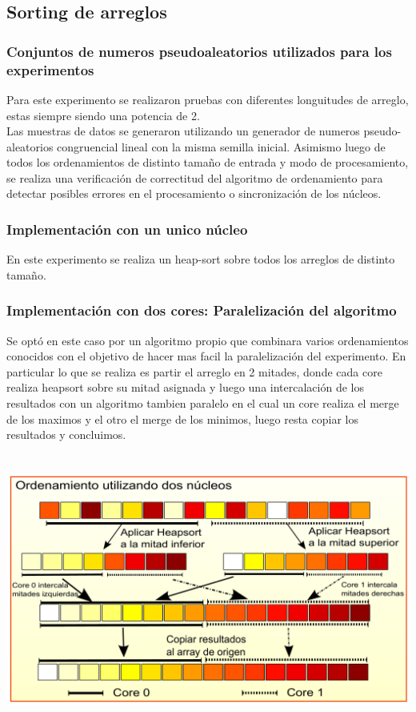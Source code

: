 \subsection{Sorting de arreglos}	
    \subsubsection{Conjuntos de numeros pseudoaleatorios utilizados para los experimentos}
    	Para este experimento se realizaron pruebas con diferentes longuitudes de arreglo, estas siempre
    	siendo una potencia de 2.\\
    	Las muestras de datos se generaron utilizando un generador de numeros pseudo-aleatorios
    	congruencial lineal con la misma semilla inicial.
        Asimismo luego de todos los ordenamientos de distinto tamaño de entrada y modo de procesamiento, se realiza una verificación de correctitud del algoritmo de ordenamiento para detectar posibles errores en el procesamiento o sincronización de los núcleos.
    \subsubsection{Implementación con un unico núcleo}
    	En este experimento se realiza un heap-sort sobre todos los arreglos de distinto tamaño.
    \subsubsection{Implementación con dos cores: Paralelización del algoritmo}
    	Se optó en este caso por un algoritmo propio que combinara varios ordenamientos conocidos con el objetivo de hacer mas facil la paralelización del experimento. En particular lo que se realiza es partir el arreglo en 2 mitades, donde cada core realiza heapsort sobre su mitad asignada y luego una intercalación de los resultados con un algoritmo tambien paralelo en el cual un core realiza el merge de los maximos y el otro el merge de los minimos, luego resta copiar los resultados y concluimos.

   	\begin{center}
        \includegraphics[height=9cm]{images/dualcore-sorting.pdf}
    \end{center}
    	

